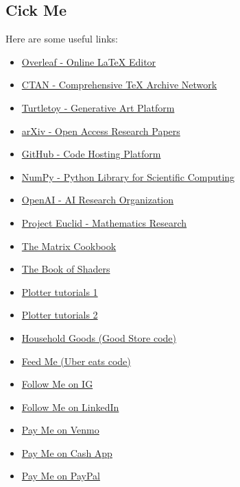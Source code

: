 \subsection{Cick Me}

Here are some useful links:

\begin{itemize}
    \item \href{https://www.overleaf.com}{Overleaf - Online LaTeX Editor}
    \item \href{https://www.ctan.org}{CTAN - Comprehensive TeX Archive Network}
    \item \href{https://turtletoy.net}{Turtletoy - Generative Art Platform}
    \item \href{https://arxiv.org}{arXiv - Open Access Research Papers}
    \item \href{https://github.com}{GitHub - Code Hosting Platform}
    \item \href{https://numpy.org}{NumPy - Python Library for Scientific Computing}
    \item \href{https://openai.com}{OpenAI - AI Research Organization}
    \item \href{https://projecteuclid.org}{Project Euclid - Mathematics Research}
    \item \href{https://www.math.uwaterloo.ca/~hwolkowi/matrixcookbook.pdf}{The Matrix Cookbook}
    \item \href{https://thebookofshaders.com/}{The Book of Shaders}
    \item \href{https://github.com/beardicus/awesome-plotters}{Plotter tutorials 1}
    \item \href{https://www.generativehut.com/tutorials}{Plotter tutorials 2}

    \item \href{https://oken.do/ggmh4kmj}{Household Goods (Good Store code)}
    \item \href{https://ubereats.com/feed?promoCode=eats-i81xs}{Feed Me (Uber eats code)}
    \item \href{https://www.instagram.com/chromatocosmos/}{Follow Me on IG}
    \item \href{https://www.linkedin.com/in/geoffrey-bradway/}{Follow Me on LinkedIn}
    \item \href{https://venmo.com/u/Geoffrey-Bradway}{Pay Me on Venmo}
    \item \href{https://cash.app/$Chromatocosmos}{Pay Me on Cash App}
    \item \href{paypal.me/chromatocosmos}{Pay Me on PayPal}
\end{itemize}
